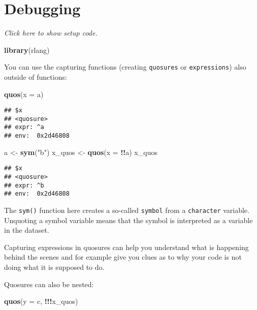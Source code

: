 \documentclass[]{book}
\newenvironment{Shaded}{\begin{snugshade}}{\end{snugshade}}
\newcommand{\DataTypeTok}[1]{\textcolor[rgb]{0.13,0.29,0.53}{#1}}
\newcommand{\KeywordTok}[1]{\textcolor[rgb]{0.13,0.29,0.53}{\textbf{#1}}}
\newcommand{\NormalTok}[1]{#1}
\newcommand{\OperatorTok}[1]{\textcolor[rgb]{0.81,0.36,0.00}{\textbf{#1}}}
\newcommand{\StringTok}[1]{\textcolor[rgb]{0.31,0.60,0.02}{#1}}
\begin{document}
\hypertarget{debugging}{%
\section{Debugging}\label{debugging}}

\emph{Click here to show setup code.}

\begin{Shaded}
\begin{Highlighting}[]
\KeywordTok{library}\NormalTok{(rlang)}
\end{Highlighting}
\end{Shaded}

You can use the capturing functions (creating \texttt{quosures} or \texttt{expressions}) also outside of functions:

\begin{Shaded}
\begin{Highlighting}[]
\KeywordTok{quos}\NormalTok{(}\DataTypeTok{x =}\NormalTok{ a)}
\end{Highlighting}
\end{Shaded}

\begin{verbatim}
## $x
## <quosure>
## expr: ^a
## env:  0x2d46808
\end{verbatim}

\begin{Shaded}
\begin{Highlighting}[]
\NormalTok{a <-}\StringTok{ }\KeywordTok{sym}\NormalTok{(}\StringTok{"b"}\NormalTok{)}
\NormalTok{x_quos <-}\StringTok{ }\KeywordTok{quos}\NormalTok{(}\DataTypeTok{x =} \OperatorTok{!!}\NormalTok{a)}
\NormalTok{x_quos}
\end{Highlighting}
\end{Shaded}

\begin{verbatim}
## $x
## <quosure>
## expr: ^b
## env:  0x2d46808
\end{verbatim}

The \texttt{sym()} function here creates a so-called \texttt{symbol} from a \texttt{character} variable.
Unquoting a symbol variable means that the symbol is interpreted as a variable in the dataset.

Capturing expressions in quosures can help you understand what is happening behind the scenes and for example give you clues as to why your code is not doing what it is supposed to do.

Quosures can also be nested:

\begin{Shaded}
\begin{Highlighting}[]
\KeywordTok{quos}\NormalTok{(}\DataTypeTok{y =}\NormalTok{ c, }\OperatorTok{!!!}\NormalTok{x_quos)}
\end{Highlighting}
\end{Shaded}
\end{document}
